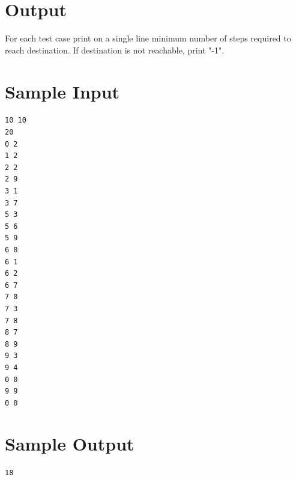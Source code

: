 \documentclass{article}
\begin{document}
\section*{Output}
For each test case print on a single line minimum number of steps required to reach destination. If destination is not reachable, print "-1".

\section*{Sample Input}
\begin{verbatim}
10 10
20
0 2
1 2
2 2
2 9
3 1
3 7
5 3
5 6
5 9
6 0
6 1
6 2
6 7
7 0
7 3
7 8
8 7
8 9
9 3
9 4
0 0
9 9
0 0

\end{verbatim}

\section*{Sample Output}
\begin{verbatim}
18
\end{verbatim}
\end{document}
